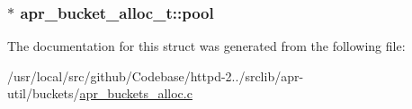 \subsubsection[{\texorpdfstring{pool}{pool}}]{$\ast$ apr\+\_\+bucket\+\_\+alloc\+\_\+t\+::pool}\hypertarget{structapr__bucket__alloc__t_a5b0c350e0a447b0d11f7791a2fa4ca18}{}\label{structapr__bucket__alloc__t_a5b0c350e0a447b0d11f7791a2fa4ca18}


The documentation for this struct was generated from the following file\+:\begin{DoxyCompactItemize}
\item 
/usr/local/src/github/\+Codebase/httpd-\/2../srclib/apr-\/util/buckets/\hyperlink{apr__buckets__alloc_8c}{apr\+\_\+buckets\+\_\+alloc.\+c}\end{DoxyCompactItemize}
